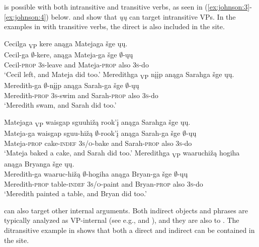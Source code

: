 \documentclass[output=paper]{LSP/langsci}
\begin{document}
 is possible with both intransitive and transitive verbs, as seen in (\ref{ex:johnson:3}-\ref{ex:johnson:4}) below.  and  show that \emph{ųų} can target intransitive VPs. In the examples in  with transitive verbs, the direct  is also included in the  site.
 
\ea\label{ex:johnson:3}
\ea\label{ex:johnson:3a} 
\glll Cecilga {\ob}\textsubscript{VP} kere{\cb} anąga Matejaga šge {\ob}ųų{\cb}.\\
Cecil-ga {} $\emptyset$-kere, anąga Mateja-ga šge $\emptyset$-ųų\\
Cecil-\textsc{prop} {} \textsc {3s}-leave and Mateja-\textsc{prop} also \textsc{3s}-do\\
\trans `Cecil left, and Mateja did too.' 
\ex\label{ex:johnson:3b} 
\glll Meredithga {\ob}\textsubscript{VP} nįįp{\cb} anąga Sarahga šge {\ob}ųų{\cb}.\\
Meredith-ga {} $\emptyset$-nįįp anąga Sarah-ga šge $\emptyset$-ųų\\
Meredith-\textsc {prop} {} \textsc{3s}-swim and Sarah-\textsc{prop} also \textsc{3s}-do\\
\trans `Meredith swam, and Sarah did too.'
\z
\z
 
\ea\label{ex:johnson:4}
\ea\label{ex:johnson:4a} 
\glll Matejaga {\ob}\textsubscript{VP} {waisgap sguuhižą} rook'į{\cb} anąga Sarahga šge {\ob}ųų{\cb}.\\
Mateja-ga {} {waisgap sguu-hižą} $\emptyset$-rook'į anąga Sarah-ga šge $\emptyset$-ųų\\
Mateja-\textsc{prop} {} cake-\textsc{indef} \textsc{3s/o}-bake and Sarah-\textsc{prop} also \textsc{3s}-do\\
\trans `Mateja baked a cake, and Sarah did too.' 
\ex\label{ex:johnson:4b} 
\glll Meredithga {\ob}\textsubscript{VP} waaruchižą hogiha{\cb} anąga Bryanga šge {\ob}ųų{\cb}.\\
Meredith-ga {} waaruc-hižą $\emptyset$-hogiha anąga Bryan-ga šge $\emptyset$-ųų\\
Meredith-\textsc{prop} {} table-\textsc{indef} \textsc{3s/o}-paint and Bryan-\textsc{prop} also \textsc{3s}-do\\
\trans `Meredith painted a table, and Bryan did too.'
\z
\z

 can also target other internal arguments. Both indirect objects and  phrases are typically analyzed as VP-internal (see e.g., \citealt{Larson1988} and \citealt{LevinRappaportHovav1995}), and they are also  to . The ditransitive example in  shows that both a direct  and indirect  can be contained in the  site.
\end{document}
